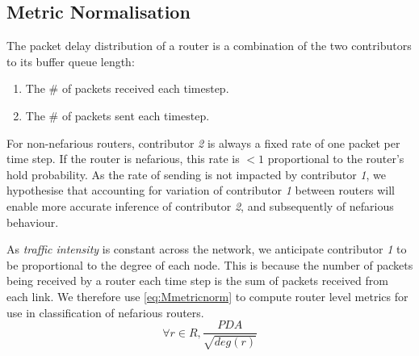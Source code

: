 \subsection{Metric Normalisation}
\label{ssec:Mmetricnormilisation}
The packet delay distribution of a router is a combination of the two contributors to its buffer queue length:
\begin{enumerate}
    \item The \# of packets received each timestep.
    \item The \# of packets sent each timestep.
\end{enumerate}
For non-nefarious routers, contributor \emph{2} is always a fixed rate of one packet per time step. If the router is nefarious, this rate is $<1$ proportional to the router's hold probability. As the rate of sending is not impacted by contributor \emph{1}, we hypothesise that accounting for variation of contributor \emph{1} between routers will enable more accurate inference of contributor \emph{2}, and subsequently of nefarious behaviour.\par
As \textit{traffic intensity} is constant across the network, we anticipate contributor \emph{1} to be proportional to the degree of each node. This is because the number of packets being received by a router each time step is the sum of packets received from each link. We therefore use \cref{eq:Mmetricnorm} to compute router level metrics for use in classification of nefarious routers.
\begin{equation}
    \label{eq:Mmetricnorm}
    \forall r\in R, \frac{PDA}{\sqrt{deg(r)}}
\end{equation}


